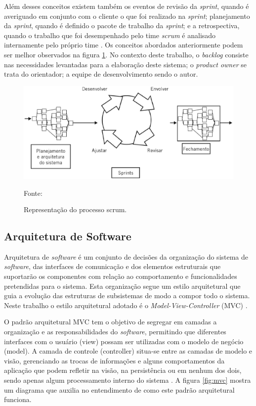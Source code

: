 Além desses conceitos existem também os eventos de revisão da \textit{sprint}, quando é averiguado em conjunto com o cliente o que foi realizado na \textit{sprint}; planejamento da \textit{sprint}, quando é definido o pacote de trabalho da \textit{sprint}; e a retrospectiva, quando o trabalho que foi desempenhado pelo time \textit{scrum} é analisado internamente pelo próprio time \cite{prik2014}. Os conceitos abordados anteriormente podem ser melhor observados na figura \ref{fig:scrum}. No contexto deste trabalho, o \textit{backlog} consiste nas necessidades levantadas para a elaboração deste sistema; o \textit{product owner} se trata do orientador; a equipe de desenvolvimento sendo o autor.

\begin{figure}[h!]
	\centering
  	\includegraphics[width=.9\linewidth]{figuras/scrum.eps}
  	\caption{Representação do processo scrum.}
  	\small{Fonte: \cite{scrum2014}}
  	\label{fig:scrum}
\end{figure}

\subsection{Arquitetura de Software}

Arquitetura de \textit{software} é um conjunto de decisões da organização do sistema de \textit{software}, das interfaces de comunicação e dos elementos estruturais que suportarão os componentes com relação ao comportamento e funcionalidades pretendidas para o sistema. Esta organização segue um estilo arquitetural que guia a evolução das estruturas de subsistemas de modo a compor todo o sistema. Neste trabalho o estilo arquitetural adotado é o \textit{Model-View-Controller} (MVC) \cite{clements2010}.

O padrão arquitetural MVC tem o objetivo de segregar em camadas a organização e as responsabilidades do \textit{software}, permitindo que diferentes interfaces com o usuário (view) possam ser utilizadas com o modelo de negócio (model). A camada de controle (controller) situa-se entre as camadas de modelo e visão, gerenciando as trocas de informações e alguns comportamentos da aplicação que podem refletir na visão, na persistência ou em nenhum dos dois, sendo apenas algum processamento interno do sistema  \cite{krasner1988}. A figura \ref{fig:mvc} mostra um diagrama que auxilia no entendimento de como este padrão arquitetural funciona.


